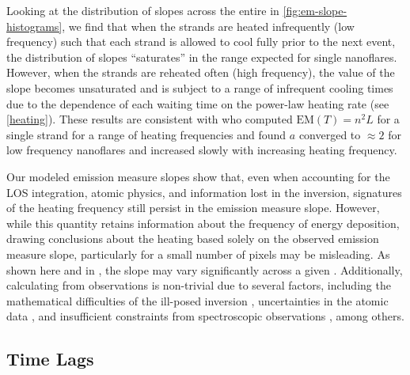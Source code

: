 Looking at the distribution of slopes across the entire \AR{} in \autoref{fig:em-slope-histograms}, we find that when the strands are heated infrequently (low frequency) such that each strand is allowed to cool fully prior to the next event, the distribution of slopes ``saturates'' in the range expected for single nanoflares. However, when the strands are reheated often (high frequency), the value of the slope becomes unsaturated and is subject to a range of infrequent cooling times due to the dependence of each waiting time on the power-law heating rate (see \autoref{heating}). These results are consistent with \citet{cargill_active_2014} who computed $\mathrm{EM}(T)=n^2L$ for a single strand for a range of heating frequencies and found $a$ converged to $\approx2$ for low frequency nanoflares and increased slowly with increasing heating frequency.

Our modeled emission measure slopes show that, even when accounting for the LOS integration, atomic physics, and information lost in the \dem{} inversion, signatures of the heating frequency still persist in the emission measure slope. However, while this quantity retains information about the frequency of energy deposition, drawing conclusions about the heating based solely on the observed emission measure slope, particularly for a small number of pixels may be misleading. As shown here and in \citet{del_zanna_evolution_2015}, the slope may vary significantly across a given \AR{}. Additionally, calculating \dem{} from observations is non-trivial due to several factors, including the mathematical difficulties of the ill-posed inversion \citep{craig_fundamental_1976,judge_failure_1995,judge_fundamental_1997}, uncertainties in the atomic data \citep{guennou_can_2013}, and insufficient constraints from spectroscopic observations \citep[e.g.][]{landi_isothermality_2010,winebarger_defining_2012}, among others.

\subsection{Time Lags}\label{timelags}

